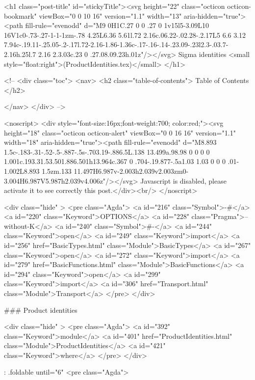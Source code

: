   <h1 class="post-title" id="stickyTitle"><svg height="22" class="octicon octicon-bookmark" viewBox="0 0 10 16" version="1.1" width="13" aria-hidden="true"><path fill-rule="evenodd" d="M9 0H1C.27 0 0 .27 0 1v15l5-3.09L10 16V1c0-.73-.27-1-1-1zm-.78 4.25L6.36 5.61l.72 2.16c.06.22-.02.28-.2.17L5 6.6 3.12 7.94c-.19.11-.25.05-.2-.17l.72-2.16-1.86-1.36c-.17-.16-.14-.23.09-.23l2.3-.03.7-2.16h.25l.7 2.16 2.3.03c.23 0 .27.08.09.23h.01z"/></svg> Sigma identities <small style="float:right">(ProductIdentities.tex)</small>
  </h1>

  <!-- 
  <div class="toc">
    <nav>
    <h2 class="table-of-contents"> Table of Contents </h2>
      

    </nav>
  </div>
   -->

  <noscript>
  <div style="font-size:16px;font-weight:700; color:red;"><svg height="18" class="octicon octicon-alert" viewBox="0 0 16 16" version="1.1" width="18" aria-hidden="true"><path fill-rule="evenodd" d="M8.893 1.5c-.183-.31-.52-.5-.887-.5s-.703.19-.886.5L.138 13.499a.98.98 0 0 0 0 1.001c.193.31.53.501.886.501h13.964c.367 0 .704-.19.877-.5a1.03 1.03 0 0 0 .01-1.002L8.893 1.5zm.133 11.497H6.987v-2.003h2.039v2.003zm0-3.004H6.987V5.987h2.039v4.006z"/></svg> Javascript is disabled, please activate it to see correctly this post.</div><br/>
  </noscript>

  <div class="hide" >
<pre class="Agda">
<a id="216" class="Symbol">{-#</a> <a id="220" class="Keyword">OPTIONS</a> <a id="228" class="Pragma">--without-K</a> <a id="240" class="Symbol">#-}</a>
<a id="244" class="Keyword">open</a> <a id="249" class="Keyword">import</a> <a id="256" href="BasicTypes.html" class="Module">BasicTypes</a>
<a id="267" class="Keyword">open</a> <a id="272" class="Keyword">import</a> <a id="279" href="BasicFunctions.html" class="Module">BasicFunctions</a>
<a id="294" class="Keyword">open</a> <a id="299" class="Keyword">import</a> <a id="306" href="Transport.html" class="Module">Transport</a>
</pre>
</div>

### Product identities

<div class="hide" >
<pre class="Agda">
<a id="392" class="Keyword">module</a>
  <a id="401" href="ProductIdentities.html" class="Module">ProductIdentities</a>
  <a id="421" class="Keyword">where</a>
</pre>
</div>


{: .foldable until="6"}
<pre class="Agda">


